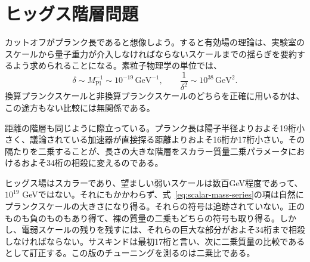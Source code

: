 \begin{classroomqa}
\end{classroomqa}

\section{ヒッグス階層問題}

カットオフがプランク長であると想像しよう。すると有効場の理論は、実験室のスケールから量子重力が介入しなければならないスケールまでの揺らぎを要約するよう求められることになる。素粒子物理学の単位では、
\begin{equation}
\delta\sim M_{\mathrm{Pl}}^{-1}\sim10^{-19}\,\mathrm{GeV}^{-1},
\qquad
\frac{1}{\delta^2}\sim10^{38}\,\mathrm{GeV}^2.
\label{eq:planck-cutoff}
\end{equation}
換算プランクスケールと非換算プランクスケールのどちらを正確に用いるかは、この途方もない比較には無関係である。

距離の階層も同じように際立っている。プランク長は陽子半径よりおよそ19桁小さく、議論されている加速器が直接探る距離よりおよそ16桁か17桁小さい。その隔たりを二乗することが、長さの大きな階層をスカラー質量二乗パラメータにおけるおよそ34桁の相殺に変えるのである。

ヒッグス場はスカラーであり、望ましい弱いスケールは数百GeV程度であって、\(10^{19}\) GeVではない。それにもかかわらず、式~\eqref{eq:scalar-mass-series}の項は自然にプランクスケールの大きさになり得る。それらの符号は追跡されていない。正のものも負のものもあり得て、裸の質量の二乗もどちらの符号も取り得る。しかし、電弱スケールの残りを残すには、それらの巨大な部分がおよそ34桁まで相殺しなければならない。サスキンドは最初17桁と言い、次に二乗質量の比較であるとして訂正する。この版のチューニングを測るのは二乗比である。

\begin{classroomqa}
\end{classroomqa}

